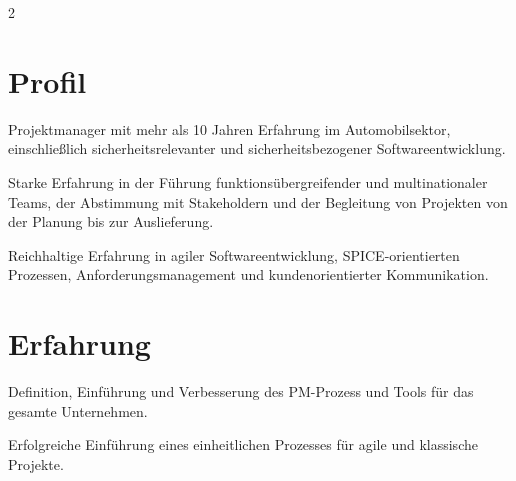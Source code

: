 {}

\begin{paracol}{2}

\switchcolumn[0]


\section{Profil}
\begin{tightemize}
\item Projektmanager mit mehr als 10 Jahren Erfahrung im Automobilsektor, einschließlich sicherheitsrelevanter und sicherheitsbezogener Softwareentwicklung.
\item Starke Erfahrung in der Führung funktionsübergreifender und multinationaler Teams, der Abstimmung mit Stakeholdern und der Begleitung von Projekten von der Planung bis zur Auslieferung.
\item Reichhaltige Erfahrung in agiler Softwareentwicklung, SPICE-orientierten Prozessen, Anforderungsmanagement und kundenorientierter Kommunikation.
\end{tightemize}
\sectionsep


\section{Erfahrung}
\begin{tightemize}
\item Definition, Einführung und Verbesserung des PM-Prozess und Tools für das gesamte Unternehmen.
\item Erfolgreiche Einführung eines einheitlichen Prozesses für agile und klassische Projekte.
\end{tightemize}
\sectionsep


\end{paracol}
